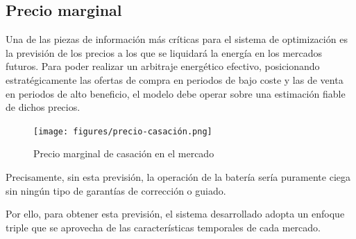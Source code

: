 \subsection{Precio marginal}
\label{makereference4.1.1}

Una de las piezas de información más críticas para el sistema de optimización es la previsión de los precios a los que se liquidará la energía en los mercados futuros. Para poder realizar un arbitraje energético efectivo, posicionando estratégicamente las ofertas de compra en periodos de bajo coste y las de venta en periodos de alto beneficio, el modelo debe operar sobre una estimación fiable de dichos precios.

\begin{figure}
\centering
\texttt{[image: figures/precio-casación.png]}
\caption{Precio marginal de casación en el mercado}
\label{fig:precio-casación}
\end{figure}

Precisamente, sin esta previsión, la operación de la batería sería puramente ciega sin ningún tipo de garantías de corrección o guiado.

Por ello, para obtener esta previsión, el sistema desarrollado adopta un enfoque triple que se aprovecha de las características temporales de cada mercado.

